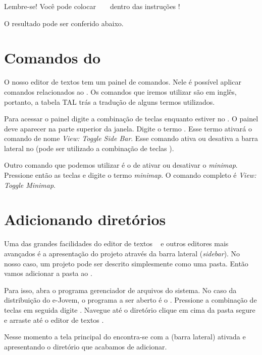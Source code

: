 

Lembre-se! Você pode colocar \tags~ \html~ dentro das instruções \php!

O resultado pode ser conferido abaixo.


\section{Comandos do \sublime}
\label{comandos-do-sublime}

O nosso editor de textos tem um painel de comandos. Nele é possível aplicar comandos
relacionados ao \sublime. Os comandos que iremos utilizar são em inglês, portanto,
a tabela TAL trás a tradução de alguns termos utilizados.

Para acessar o painel digite a combinação de teclas \ctrlshiftp enquanto estiver
no \sublime. O painel deve aparecer na parte superior da janela. Digite o termo
\sidebar. Esse termo ativará o comando de nome \textit{View: Toggle Side Bar}.
Esse comando ativa ou desativa a barra lateral no \sublime (pode ser utilizado
a combinação de teclas \sublimesidebar). 

Outro comando que podemos utilizar é o de ativar ou desativar o \textit{minimap}. 
Pressione então as teclas \ctrlshiftp e digite o termo \textit{minimap}. 
O comando completo é \textit{View: Toggle Minimap}.

\section{Adicionando diretórios}
\label{adicionando-diretorios}

Uma das grandes facilidades do editor de textos \sublime~ e outros editores mais
avançados é a apresentação do projeto através da barra lateral (\textit{sidebar}).
No nosso caso, um projeto pode ser descrito simplesmente como uma pasta. Então
vamos adicionar a pasta  ao \sublime. 

Para isso, abra o programa gerenciador de arquivos do sistema. No caso da 
distribuição do e-Jovem, o programa a ser aberto é o \thunar. Pressione a 
combinação de teclas \altfdois em seguida digite \thunar. Navegue até o 
diretório  clique em cima da pasta  
segure e arraste até o editor de textos \sublime.

Nesse momento a tela principal do \sublime encontra-se com a \sideb (barra lateral)
ativada e apresentando o diretório que acabamos de adicionar.

